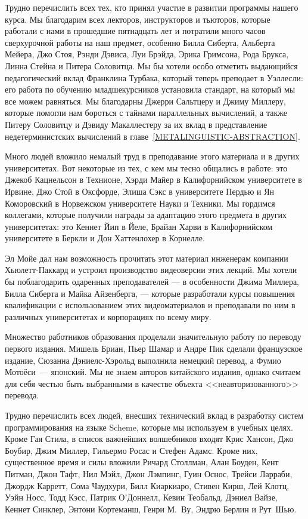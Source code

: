 Трудно перечислить всех тех, кто принял участие в
развитии программы нашего курса.  Мы благодарим всех лекторов,
инструкторов и тьюторов, которые работали с нами в прошедшие
пятнадцать лет и потратили много часов сверхурочной работы на наш предмет,
особенно Билла Сиберта, Альберта Мейера, Джо Стоя, Рэнди Дэвиса, Луи
Брэйда, Эрика Гримсона, Рода Брукса, Линна Стейна и Питера
Соловитца. Мы бы хотели особо отметить выдающийся педагогический вклад 
Франклина Турбака, который теперь преподает в Уэллесли: его работа по
обучению младшекурсников установила стандарт, на который мы все
можем равняться.  Мы благодарны Джерри Сальтцеру и Джиму Миллеру,
которые помогли нам бороться с тайнами параллельных вычислений, а
также Питеру Соловитцу и Дэвиду Макаллестеру за их вклад в
представление недетерминистских вычислений в 
главе~\ref{METALINGUISTIC-ABSTRACTION}.

Много людей вложило немалый труд в преподавание этого
материала и в других университетах.  Вот некоторые из тех, с кем мы тесно
общались в работе: это Джекоб Кацнельсон в Технионе, Хэрди Майер в
Калифорнийском университете в Ирвине, Джо Стой в Оксфорде, Элиша Сэкс
в университете Пердью и Ян Коморовский в Норвежском университете Науки 
и Техники.  Мы гордимся коллегами, которые получили
награды за адаптацию этого предмета в других университетах: это
Кеннет Йип в Йеле, Брайан Харви в Калифорнийском университете в
Беркли и Дон Хаттенлохер в Корнелле.

Эл Мойе дал нам возможность прочитать этот материал инженерам 
компании Хьюлетт-Пак\-кард и устроил производство видеоверсии этих лекций.  Мы
хотели бы поблагодарить одаренных преподавателей --- в особенности Джима 
Миллера, Билла Сиберта и Майка Айзенберга, --- которые разработали
курсы повышения квалификации с использованием этих видеоматериалов и
преподавали по ним в различных университетах и корпорациях по всему миру.

Множество работников образования проделали значительную
работу по переводу первого издания. Мишель Бриан, Пьер Шамар и Андре
Пик сделали французское издание, Сюзанна Дэ\-ни\-елс-Хэ\-рольд выполнила
немецкий перевод, а Фумио Мотоёси~--- японский.  Мы не
знаем авторов китайского издания, однако считаем для себя честью быть
выбранными в качестве объекта <<неавторизованного>> перевода.

Трудно перечислить всех людей, внесших технический вклад в
разработку систем программирования на языке Scheme, которые мы
используем в учебных целях.  Кроме Гая Стила, в список важнейших
волшебников входят Крис Хансон, Джо Боубир, Джим Миллер,
Гильермо Росас и Стефен Адамс.  Кроме них, существенное время и силы
вложили Ричард Столлман, Алан Боуден, Кент Питман, Джон Тафт, Нил
Мэйл, Джон Лэмпинг, Гуин Оснос, Трейси Ларраби, Джордж Карретт, Сома
Чаудхури, Билл Киаркиаро, Стивен Кирш, Лей Клотц, Уэйн Носс, Тодд Кэсс, 
Патрик О'Доннелл, Кевин Теобальд, Дэниел Вайзе, Кеннет Синклер, Энтони 
Кортеманш, Генри М.~Ву, Эндрю Берлин и Рут~Шью.

